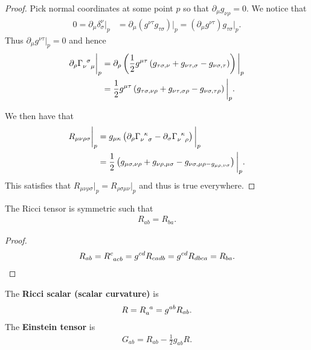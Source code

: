\begin{proof}
    Pick normal coordinates at some point $p$ so that $\partial_\mu g_{\nu \rho} = 0$. We notice that
    \begin{align}
        0 = \partial_\mu \delta^{\nu}_\sigma \bigg|_p &= \partial_\mu \left( g^{\nu \tau}g_{\tau \sigma} \right) \bigg|_p = \left( \partial_\mu g^{\nu \tau} \right) g_{\tau \sigma} \bigg|_p
    .\end{align}
    Thus $\partial_\mu g^{\nu \tau} \bigg|_p = 0$ and hence
    \begin{align}
        \partial_\rho \tensor{\Gamma}{_\nu^{\sigma}_\mu} \bigg|_p &= \partial_\rho \left( \frac{1}{2} g^{\mu \tau} \left( g_{\tau \sigma, \nu} + g_{\nu \tau , \sigma} - g_{\nu \sigma, \tau} \right)  \right) \bigg|_p \\
        &= \frac{1}{2} g^{\mu \tau} \left( g_{\tau \sigma, \nu \rho} + g_{\nu \tau, \sigma \rho} - g_{\nu \sigma, \tau \rho} \right) \bigg|_p 
    .\end{align}

    We then have that
    \begin{align}
        R_{\mu \nu \rho \sigma} \bigg|_p &= g_{\mu \kappa  }\left( \partial_\rho \tensor{\Gamma}{_{\nu}^{\kappa}_{\sigma}} - \partial_\sigma \tensor{\Gamma}{_{\nu}^{\kappa}_{\rho}}\right)\bigg|_p \\
        &= \frac{1}{2} \left( g_{\mu \sigma, \nu \rho} + g_{\nu \rho , \mu \sigma} - g_{\nu \sigma, \mu \rho - g_{\mu \rho , \nu \sigma}} \right) \bigg|_p 
    .\end{align}
    This satisfies that $R_{\mu \nu \rho \sigma} \bigg|_p = R_{\rho \sigma \mu \nu} \bigg|_p$ and thus is true everywhere.

\end{proof}

\begin{corollary}
    The Ricci tensor is symmetric such that
    \begin{align}
        R_{ab} = R_{ba}
    .\end{align}
\end{corollary}

\begin{proof}
    \begin{align}
        R_{ab} = \tensor{R}{^{c}_{acb}} = g^{cd} R_{cadb} = g^{cd} R_{dbca} = R_{ba}
    .\end{align}
\end{proof}

\begin{definition}
    The \textbf{Ricci scalar (scalar curvature)} is
    \begin{align}
        R = \tensor{R}{_{a}^{a}} = g^{ab} R_{ab}
    .\end{align}
    The \textbf{Einstein tensor} is
    \begin{align}
        G_{ab} = R_{ab} -\frac{1}{2} g_{ab}R
    .\end{align}
\end{definition}

